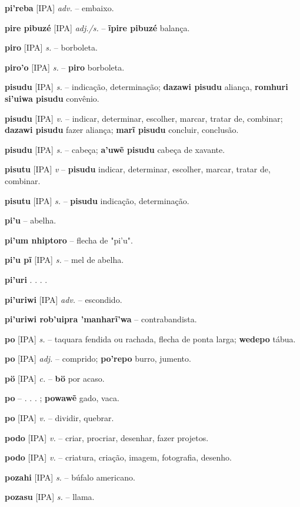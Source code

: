 \textbf{pi'reba} [IPA] \textit{adv.} -- embaixo.

\textbf{pire pibuzé} [IPA] \textit{adj./s.} -- \textbf{ĩpire pibuzé} balança.

\textbf{piro} [IPA] \textit{s.} -- borboleta.

\textbf{piro'o} [IPA] \textit{s.} -- \textbf{piro} borboleta.

\textbf{pisudu} [IPA] \textit{s.} -- indicação, determinação; \textbf{dazawi pisudu} aliança, \textbf{romhuri si'uiwa pisudu} convênio.

\textbf{pisudu} [IPA] \textit{v.} -- indicar, determinar, escolher, marcar, tratar de, combinar; \textbf{dazawi pisudu} fazer aliança; \textbf{marĩ pisudu} concluir, conclusão.

\textbf{pisudu} [IPA] \textit{s.} -- cabeça; \textbf{a'uwẽ pisudu} cabeça de xavante.

\textbf{pisutu} [IPA] \textit{v} -- \textbf{pisudu} indicar, determinar, escolher, marcar, tratar de, combinar.

\textbf{pisutu} [IPA] \textit{s.} -- \textbf{pisudu} indicação, determinação.

\textbf{pi'u} -- abelha.

\textbf{pi'um nhiptoro} -- flecha de "pi'u".

\textbf{pi'u pĩ} [IPA] \textit{s.} -- mel de abelha.

\textbf{pi'uri} . . . .

\textbf{pi'uriwi} [IPA] \textit{adv.} -- escondido.

\textbf{pi'uriwi rob'uipra 'manharĩ'wa} -- contrabandista.

\textbf{po} [IPA] \textit{s.} -- taquara fendida ou rachada, flecha de ponta larga; \textbf{wedepo} tábua.

\textbf{po} [IPA] \textit{adj.} -- comprido; \textbf{po'repo} burro, jumento.

\textbf{pö} [IPA] \textit{c.} -- \textbf{bö} por acaso.

\textbf{po} -- . . . ; \textbf{powawẽ} gado, vaca.

\textbf{po} [IPA] \textit{v.} -- dividir, quebrar.

\textbf{podo} [IPA] \textit{v.} -- criar, procriar, desenhar, fazer projetos.

\textbf{podo} [IPA] \textit{v.} -- criatura, criação, imagem, fotografia, desenho.

\textbf{pozahi} [IPA] \textit{s.} -- búfalo americano.

\textbf{pozasu} [IPA] \textit{s.} -- llama.

